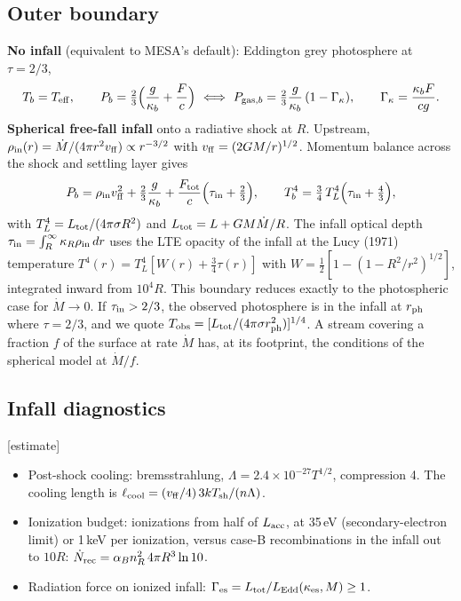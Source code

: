 \documentclass[11pt]{article}
\newcommand{\Mdot}{\dot M}
\newcommand{\kes}{\kappa_{\rm es}}
\newcommand{\status}[1]{\textsf{\small\textcolor{black!60}{[#1]}}}
\begin{document}
\subsection{Outer boundary}
\textbf{No infall} (equivalent to MESA's default): Eddington grey photosphere at $\tau=2/3$,
\begin{equation}
T_b=T_{\rm eff},\qquad P_b=\tfrac23\Big(\frac{g}{\kappa_b}+\frac{F}{c}\Big)\ \Longleftrightarrow\
P_{{\rm gas},b}=\tfrac23\frac{g}{\kappa_b}\,(1-\Gamma_\kappa),\qquad \Gamma_\kappa=\frac{\kappa_bF}{cg}.
\end{equation}
\textbf{Spherical free-fall infall} onto a radiative shock at $R$. Upstream,
$\rho_{\rm in}(r)=\Mdot/(4\pi r^2v_{\rm ff})\propto r^{-3/2}$ with $v_{\rm ff}=(2GM/r)^{1/2}$. Momentum balance across the
shock and settling layer gives
\begin{equation}
P_b=\rho_{\rm in}v_{\rm ff}^2+\tfrac23\frac{g}{\kappa_b}+\frac{F_{\rm tot}}{c}\Big(\tau_{\rm in}+\tfrac23\Big),\qquad
T_b^4=\tfrac34\,T_L^4\Big(\tau_{\rm in}+\tfrac43\Big),
\end{equation}
with $T_L^4=L_{\rm tot}/(4\pi\sigma R^2)$ and $L_{\rm tot}=L+GM\Mdot/R$. The infall optical depth
$\tau_{\rm in}=\int_R^\infty\kappa_R\rho_{\rm in}\,dr$ uses the LTE opacity of the infall at the Lucy (1971) temperature
$T^4(r)=T_L^4[W(r)+\tfrac34\tau(r)]$ with $W=\tfrac12[1-(1-R^2/r^2)^{1/2}]$, integrated inward from $10^4R$.
This boundary reduces exactly to the photospheric case for $\Mdot\to0$. If $\tau_{\rm in}>2/3$, the observed photosphere
is in the infall at $r_{\rm ph}$ where $\tau=2/3$, and we quote $T_{\rm obs}=[L_{\rm tot}/(4\pi\sigma r_{\rm ph}^2)]^{1/4}$.
A stream covering a fraction $f$ of the surface at rate $\Mdot$ has, at its footprint, the conditions of the
spherical model at $\Mdot/f$.

\subsection{Infall diagnostics}\status{estimate}
\begin{itemize}
\item Post-shock cooling: bremsstrahlung, $\Lambda=2.4\times10^{-27}T^{1/2}$, compression 4. The cooling length is $\ell_{\rm cool}=(v_{\rm ff}/4)\,3kT_{\rm sh}/(n\Lambda)$.
\item Ionization budget: ionizations from half of $L_{\rm acc}$, at 35\,eV (secondary-electron limit) or 1\,keV per ionization, versus case-B recombinations in the infall out to $10R$: $\dot N_{\rm rec}=\alpha_Bn_R^2\,4\pi R^3\ln10$.
\item Radiation force on ionized infall: $\Gamma_{\rm es}=L_{\rm tot}/L_{\rm Edd}(\kes,M)\ge1$.
\end{itemize}
\end{document}
